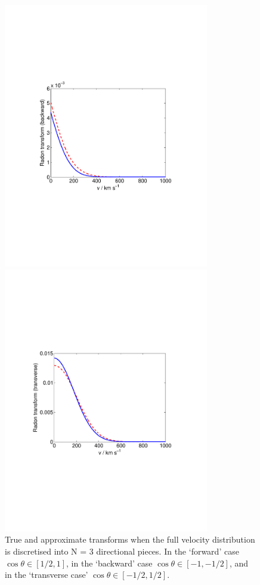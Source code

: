 \begin{figure}[t]
  \includegraphics[trim={2cm 8cm 2cm 8cm},clip,width=0.80\textwidth]{Directional/N3-backward.pdf}

  \includegraphics[trim={2cm 8cm 2cm 8cm},clip,width=0.80\textwidth]{Directional/N3-transverse.pdf}

\caption[True and approximate Radon transforms $N=3$ components]{True and approximate transforms when the full velocity distribution is discretised into N = 3 directional pieces. In the `forward' case $\cos\theta \in [1/2,1]$, in the `backward' case $\cos\theta \in [-1, -1/2]$, and in the `transverse case' $\cos\theta \in [-1/2, 1/2]$.}
\end{figure}

